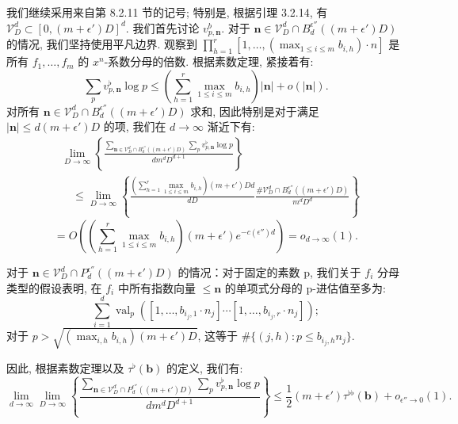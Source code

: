 我们继续采用来自第 8.2.11 节的记号; 
特别是, 根据引理 3.2.14, 有 \(\mathcal{V}_D^d \subset [0, (m+\epsilon')D]^d\). 
我们首先讨论 \(v_{p,\mathbf{n}}^b\). 
对于 \(\mathbf{n} \in \mathcal{V}_D^d \cap B_d^{\epsilon''}((m+\epsilon')D)\) 的情况, 我们坚持使用平凡边界. 
观察到 \(\prod_{h=1}^r [1,\ldots,(\max_{1\leq i\leq m}b_{i,h})\cdot n]\) 是所有 \(f_1,\ldots,f_m\) 的 \(x^n\)-系数分母的倍数. 
根据素数定理, 紧接着有:
\begin{equation}\label{eq:8.2.31}
\sum_{p} v_{p,\mathbf{n}}^{\flat} \log p \le \left(\sum_{h=1}^{r} \max_{1 \le i \le m} b_{i,h}\right) |\mathbf{n}| + o(|\mathbf{n}|).
\end{equation}
对所有 \(\mathbf{n} \in \mathcal{V}_D^d \cap B_d^{\epsilon''}((m+\epsilon')D)\) 求和, 
因此特别是对于满足 \(|\mathbf{n}| \leq d(m+\epsilon')D\) 的项, 我们在 \(d \to \infty\) 渐近下有:
\begin{equation}\label{eq:8.2.32}
\begin{aligned}
& \lim_{D \to \infty} \left\{ \frac{\sum_{\mathbf{n} \in \mathcal{V}_{D}^{d} \cap B_{d}^{\epsilon''}((m+\epsilon')D)} \sum_{p} v_{p,\mathbf{n}}^{\flat} \log p}{dm^{d}D^{d+1}} \right\} \\
& \quad \leq \lim_{D \to \infty} \left\{ \frac{\left(\sum_{h=1}^{r} \max_{1 \leq i \leq m} b_{i,h}\right) (m+\epsilon')Dd}{dD} \frac{\#\mathcal{V}_{D}^{d} \cap B_{d}^{\epsilon''}((m+\epsilon')D)}{m^{d}D^{d}} \right\}
\end{aligned}
\end{equation}
\[ = O\left(\left(\sum_{h=1}^{r} \max_{1 \leq i \leq m} b_{i,h}\right) (m+\epsilon')e^{-c(\epsilon'')d}\right) = o_{d \to \infty}(1). \]

对于 \(\mathbf{n} \in \mathcal{V}_D^d \cap P_d^{\epsilon''}((m+\epsilon')D)\) 的情况：对于固定的素数 p, 
我们关于 \(f_i\) 分母类型的假设表明, 
在 \(f_i\) 中所有指数向量 \(\leq \mathbf{n}\) 的单项式分母的 p-进估值至多为:
\[ \sum_{i=1}^{d} \operatorname{val}_{p} \left( [1, \dots, b_{i_{j}, 1} \cdot n_{j}] \cdots [1, \dots, b_{i_{j}, r} \cdot n_{j}] \right); \]
对于 \(p > \sqrt{(\max_{i,h} b_{i,h})(m + \epsilon')D}\), 这等于 \(\#\{(j,h) : p \leq b_{i_j,h}n_j\}\).

因此, 根据素数定理以及 \(\tau^{\flat}(\mathbf{b})\) 的定义, 我们有:
\begin{equation}\label{eq:8.2.33}
\lim_{d \to \infty} \lim_{D \to \infty} \left\{ \frac{\sum_{\mathbf{n} \in \mathcal{V}_D^d \cap P_d^{\epsilon''}((m+\epsilon')D)} \sum_p v_{p,\mathbf{n}}^{\flat} \log p}{dm^d D^{d+1}} \right\} \le \frac{1}{2} (m+\epsilon') \tau^{\flat\flat}(\mathbf{b}) + o_{\epsilon'' \to 0}(1).
\end{equation}

